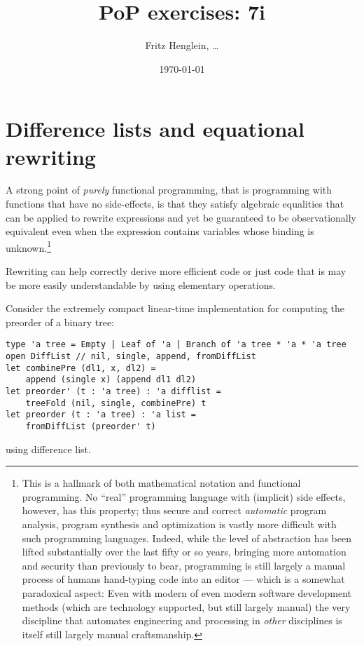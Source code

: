 \documentclass[a4paper,11pt]{article}
\title{PoP exercises: 7i}
\date\today
\author{Fritz Henglein, \ldots}
\begin{document}
\maketitle


\section{Difference lists and equational rewriting}

A strong point of \emph{purely} functional programming, that is programming with functions that have no side-effects, is that they satisfy algebraic equalities that can be applied to rewrite expressions and yet be guaranteed to be observationally equivalent even when the expression contains variables whose binding is unknown.\footnote{This is a hallmark of both mathematical notation and functional programming. No ``real'' programming language with (implicit) side effects, however, has this property; thus secure and correct \emph{automatic} program analysis, program synthesis and optimization is vastly more difficult with such programming languages.  Indeed, while the level of abstraction has been lifted substantially over the last fifty or so years, bringing more automation and security than previously to bear, programming is still largely a manual process of humans hand-typing code into an editor --- which is a somewhat paradoxical aspect:  Even with modern of even modern software development methods (which are technology supported, but still largely manual) the very discipline that automates engineering and processing in \emph{other} disciplines is itself still largely manual craftsmanship.}

Rewriting can help correctly derive more efficient code or just code that is may be more easily understandable by using elementary operations.

Consider the extremely compact linear-time implementation for computing the preorder of a binary tree:
\begin{verbatim}
type 'a tree = Empty | Leaf of 'a | Branch of 'a tree * 'a * 'a tree
open DiffList // nil, single, append, fromDiffList
let combinePre (dl1, x, dl2) = 
    append (single x) (append dl1 dl2)
let preorder' (t : 'a tree) : 'a difflist =
    treeFold (nil, single, combinePre) t
let preorder (t : 'a tree) : 'a list = 
    fromDiffList (preorder' t)
\end{verbatim}
using difference list.
\end{document}
